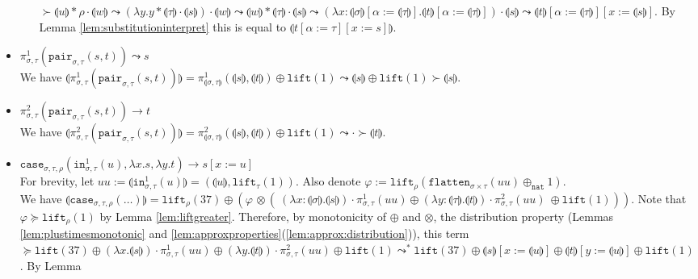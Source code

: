 \documentclass[runningheads,a4paper]{llncs}
\newcommand{\typeinterpret}[1]{\llparenthesis #1 \rrparenthesis}
\newcommand{\interpret}[1]{\llparenthesis #1 \rrparenthesis}
\newcommand{\red}{\longrightarrow}
\newcommand{\abs}[2]{\lambda #1.#2}
\newcommand{\nat}{\mathtt{nat}}
\newcommand{\proj}{\pi}
\newcommand{\flatten}{\mathtt{flatten}}
\newcommand{\lift}{\mathtt{lift}}
\begin{document}
\begin{itemize}
\begin{itemize}
    $\succ \interpret{u} * \rho \cdot \interpret{w}
    \leadsto (\abs{y}{y * \typeinterpret{\tau} \cdot \interpret{s}})
    \cdot \interpret{w} \leadsto \interpret{w} * \typeinterpret{\tau}
    \cdot \interpret{s} \leadsto (\abs{x:\typeinterpret{\sigma}[\alpha:=
    \typeinterpret{\tau}]}{\interpret{t}[\alpha:=\typeinterpret{\tau}]})
    \cdot \interpret{s} \leadsto \interpret{t}[\alpha:=\typeinterpret{
    \tau}][x:=\interpret{s}]$.  By Lemma
    \ref{lem:substitutioninterpret} this is equal to
    $\interpret{t[\alpha:=\tau][x:=s]}$.
  \end{itemize}
\item $\pi^1_{\sigma,\tau}(\mathtt{pair}_{\sigma,\tau}(s,t)) \leadsto
  s$ \\
  We have $\interpret{\pi^1_{\sigma,\tau}(\mathtt{pair}_{\sigma,\tau}(
  s,t))} = \pi^1_{\typeinterpret{\sigma,\tau}}(\interpret{s},
  \interpret{t}) \oplus \lift(1) \leadsto \interpret{s} \oplus
  \lift(1) \succ \interpret{s}$.
\item $\pi^2_{\sigma,\tau}(\mathtt{pair}_{\sigma,\tau}(s,t)) \red t$ \\
  We have $\interpret{\pi^2_{\sigma,\tau}(\mathtt{pair}_{\sigma,\tau}(
 s,t))} = \pi^2_{\typeinterpret{\sigma,\tau}}(\interpret{s},
  \interpret{t}) \oplus \lift(1) \leadsto \cdot \succ \interpret{t}$.
\item $\mathtt{case}_{\sigma,\tau,\rho}(\mathtt{in}^1_{\sigma,\tau}(u),
  \abs{x}{s},\abs{y}{t}) \red s[x:=u]$ \\
  For brevity, let $uu := \interpret{\mathtt{in}^1_{\sigma,\tau}(u)} =
  (\interpret{u}, \lift_\tau(1))$.
  Also denote $\varphi := \lift_\rho(\flatten_{\sigma \times \tau}(
  uu) \oplus_{\nat} 1)$. \\
  We have $\interpret{\mathtt{case}_{\sigma,\tau,\rho}(\dots)} =
  \lift_\rho(37) \oplus (\varphi\,\otimes (\ (\abs{x:
  \typeinterpret{\sigma}}{\interpret{s}}) \cdot \proj^1_{\sigma,\tau}(
  uu) \oplus
  (\abs{y:\typeinterpret{\tau}}{\interpret{t}}) \cdot \proj^2_{\sigma,
  \tau}(uu)\ \oplus \lift(1)))$.
  Note that $\varphi \succeq \lift_\rho(1)$ by
  Lemma \ref{lem:liftgreater}.  Therefore, by monotonicity of $\oplus$
  and $\otimes$, the distribution property (Lemmas
  \ref{lem:plustimesmonotonic} and
  \ref{lem:approxproperties}(\ref{lem:approx:distribution})), this
  term $\succeq \lift(37) \oplus (\abs{x}{\interpret{s}}) \cdot
  \proj^1_{\sigma,\tau}(uu) \oplus (\abs{y}{\interpret{t}}) \cdot
  \proj^2_{\sigma,\tau}(uu) \oplus \lift(1) \leadsto^* \lift(37) \oplus
  \interpret{s}[x:=\interpret{u}] \oplus
  \interpret{t}[y:=\interpret{u}] \oplus \lift(1)$.  By Lemma

\end{itemize}
\end{document}
